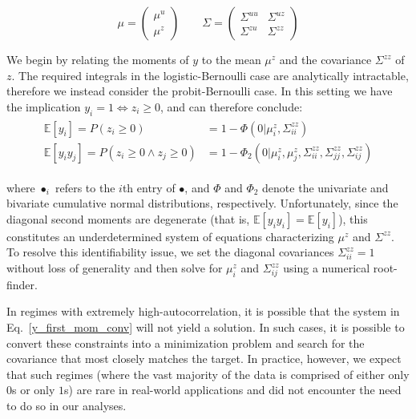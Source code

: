 \begin{equation}
\mu = \begin{pmatrix}
    \mu^u \\
    \mu^z
\end{pmatrix} \qquad
\Sigma = \begin{pmatrix}
    \Sigma^{uu} & \Sigma^{uz}\\
    \Sigma^{zu} & \Sigma^{zz}
\end{pmatrix}
\label{jointdef}
\end{equation}

We begin by relating the moments of $y$ to the mean $\mu^z$ and the covariance $\Sigma^{zz}$ of $z$. The required integrals in the logistic-Bernoulli case are analytically intractable, therefore we instead consider the probit-Bernoulli case. In this setting we have the implication $y_i = 1 \iff z_i \geq 0$, and can therefore conclude:
\begin{align}
    \begin{split}
    \mathbb{E}[y_i] = P(z_i \geq 0) &= 1 - \Phi(0 | \mu^z_i, \Sigma^{zz}_{ii}) \\
    \mathbb{E}[y_i y_j] = P(z_i \geq 0 \land z_j \geq 0) &= 1 - \Phi_2(0 | \mu^z_i, \mu^z_j, \Sigma^{zz}_{ii}, \Sigma^{zz}_{jj}, \Sigma^{zz}_{ij})
    \end{split}
    \label{y_first_mom_conv}
\end{align}

\noindent where $\bullet_i$ refers to the $i$th entry of $\bullet$, and $\Phi$ and $\Phi_2$ denote the univariate and bivariate cumulative normal distributions, respectively. Unfortunately, since the diagonal second moments are degenerate (that is, $\mathbb{E}[y_iy_i] = \mathbb{E}[y_i]$), this constitutes an underdetermined system of equations characterizing $\mu^z$ and $\Sigma^{zz}$. To resolve this identifiability issue, we set the diagonal covariances $\Sigma^{zz}_{ii} = 1$ without loss of generality and then solve for $\mu^{z}_i$ and $\Sigma^{zz}_{ij}$ using a numerical root-finder. 

In regimes with extremely high-autocorrelation, it is possible that the system in Eq.~\ref{y_first_mom_conv} will not yield a solution. In such cases, it is possible to convert these constraints into a minimization problem and search for the covariance that most closely matches the target. In practice, however, we expect that such regimes (where the vast majority of the data is comprised of either only $0$s or only $1$s) are rare in real-world applications and did not encounter the need to do so in our analyses.

